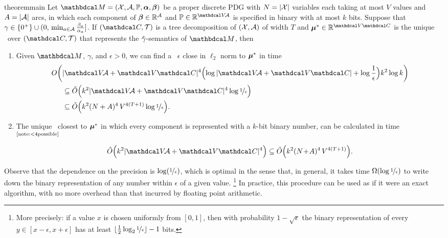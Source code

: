 \begin{linked}{theorem}{main}
Let $\dg M = (\X, \Ar, \mathbb P, \balpha, \bbeta)$
be a proper discrete PDG with $N = |\mathcal X|$ variables each taking at most $V$ values
and $A = |\mathcal A|$ arcs,
in which each component of 
$\boldsymbol\beta \in 
    \mathbb R^{\mathcal A}$
and $\mathbb P \in
    \mathbb R^{\V\!\Ar}$
is specified in binary with
at most
$k$ bits.
Suppose that $\gamma \in \{0^+\}\cup (0,\,  \min_{a \in \mathcal A} \frac{ \beta_a}{\alpha_a}]$.
If $(\C, \mathcal T)$ is a tree decomposition of $(\mathcal X,\mathcal A)$ of width $T$
and $\bmu^* \in \mathbb R^{\V\C}$ 
is the unique \cactree\ over $(\C, \mathcal T)$ 
that represents the $\zogamma$-semantics of $\dg M$,
then
\begin{enumerate}[wide, label={\rm{(\alph*)}}]
\item 
Given $\dg M$, $\gamma$, and $\epsilon > 0$, 
we can find a \cactree\ $\epsilon$ close in $\ell_2$ norm to 
$\boldsymbol\mu^*$
in time
\onlyfirsttime{%
\unskip$^\text{\ref{note:<4possible}}$%
}
\begin{align*}
    O\pqty[\bigg]{&|\V\!\Ar + \V\C|^{4}
        \pqty[\Big]{ \log |\V\!\Ar + \V\C| + \log \frac1\epsilon} k^2 \log k 
    }
    \\
    &\subseteq
    \tilde O\pqty[\Big]{k^2 |\V\!\Ar + \V\C|^{4}
        \log \nf 1\epsilon 
    }
    \\
    &\subseteq
    \tilde O\pqty[\Big]{k^2 (N+A)^4\,V^{4(T+1)}
         \log \nf 1\epsilon }
.
\end{align*}
\item
The unique \actree\ closest to $\boldsymbol\mu^*$ 
in which every component is represented with a $k$-bit binary number,
can be calculated in time 
\unskip$^\text{\ref{note:<4possible}}$%
\[
    \tilde O\pqty[\Big]{k^2 |\V\!\Ar + \V\C|^{4}}
    \subseteq
    \tilde O\pqty[\Big]{k^2 (N\!+\!A)^{4}\, V^{4(T+1
    )}}.
\]
\end{enumerate}
\end{linked}

Observe that the dependence on the precision is $\log (\nicefrac1\epsilon)$, which is optimal in the sense that, in general, it takes time $\Omega(\log \nicefrac 1\epsilon)$ to write down the binary representation of any number within $\epsilon$ of a given value.
\unskip\footnote{
    More precisely: if a value $x$ is chosen uniformly from $[0,1]$, then
    with probability $1-\sqrt\epsilon$ the binary representation of every $y \in [x-\epsilon, x+\epsilon]$ 
    has at least $\lfloor \frac12 \log_2 \nicefrac1\epsilon \rfloor -1$ bits.
    }
In practice, this procedure can be used as if it were an exact algorithm,
with no more overhead than that incurred by floating point arithmetic. 





